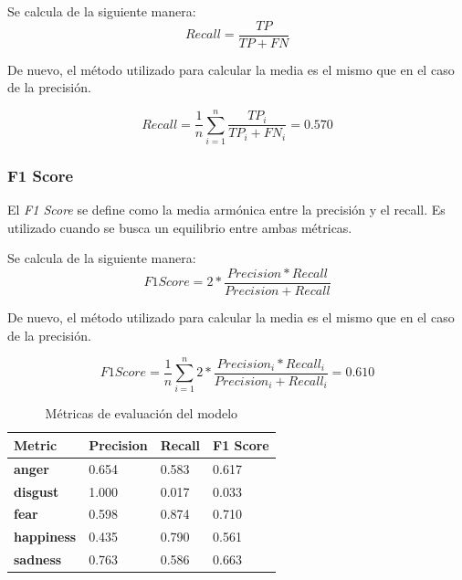 Se calcula de la siguiente manera:
\begin{equation}
    Recall = \frac{TP}{TP + FN}
\end{equation}

De nuevo, el método utilizado para calcular la media es el mismo que en el caso de la precisión.

\begin{equation}
    Recall = \frac{1}{n} \sum_{i=1}^{n} \frac{TP_i}{TP_i + FN_i} = 0.570
\end{equation}

\subsubsection{F1 Score}\label{seccion:f1-score}
El \textit{F1 Score} se define como la media armónica entre la precisión y el recall.
Es utilizado cuando se busca un equilibrio entre ambas métricas.

Se calcula de la siguiente manera:
\begin{equation}
    F1 Score = 2 * \frac{Precision * Recall}{Precision + Recall}
\end{equation}

De nuevo, el método utilizado para calcular la media es el mismo que en el caso de la precisión.

\begin{equation}
    F1 Score = \frac{1}{n} \sum_{i=1}^{n} 2 * \frac{Precision_i * Recall_i}{Precision_i + Recall_i} = 0.610
\end{equation}




\begin{table}[htpb]
    \centering
    \begin{tabular}{|l|l|l|l|}
        \hline
        \textbf{Metric} & \textbf{Precision} & \textbf{Recall} & \textbf{F1 Score} \\ \hline
        \textbf{anger} & 0.654 & 0.583 & 0.617 \\ \hline
        \textbf{disgust} & 1.000 & 0.017 & 0.033 \\ \hline
        \textbf{fear} & 0.598 & 0.874 & 0.710 \\ \hline
        \textbf{happiness} & 0.435 & 0.790 & 0.561 \\ \hline
        \textbf{sadness} & 0.763 & 0.586 & 0.663 \\ \hline
    \end{tabular}
    \caption{Métricas de evaluación del modelo}
    \label{tab:model-metrics}
\end{table}


